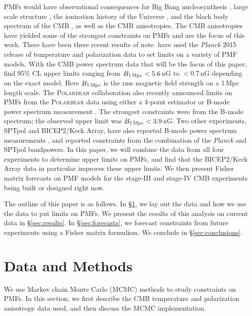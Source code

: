 \documentclass[apj]{emulateapj}
\newcommand{\bpmf}{\ensuremath{B_{\rm 1\,Mpc}}}
\newcommand{\planck}{{\sl Planck}}
\newcommand{\bicepkeck}{BICEP2/Keck Array}
\newcommand{\pb}{\textsc{Polarbear}}
\newcommand{\sptpol}{SPTpol}
\begin{document}
PMFs would have observational consequences for Big Bang nucleosynthesis \citep[e.g.,][]{kahniashvili10}, large scale structure \citep[e.g.,][]{battaner97}, the ionization history of the Universe \citep{kunze15}, and the black body spectrum of the CMB \citep[e.g.,][]{kunze14},  as well as the CMB anisotropies. 
The CMB anisotropies have yielded some of the strongest constraints on PMFs and are the focus of this work.
There have been three recent results of note. 
\citet{planck15-19} have used the \planck{} 2015 release of temperature and polarization data to set limits on a variety of PMF models. 
With the CMB power spectrum data that will be the focus of this paper, \citet{planck15-19} find 95\% CL upper limits ranging from $\bpmf < 5.6$\,nG to $<0.7$\,nG depending on the exact model. 
Here \bpmf{} is the rms magnetic field strength on a 1\,Mpc length scale. 
The \pb{} collaboration also recently announced limits on PMFs from the \pb{} data using either a 4-point estimator or B-mode power spectrum measurement \citep{polarbear15}. 
The strongest constraints were from the B-mode spectrum; the observed upper limit was $\bpmf < 3.9$\,nG. 
Two other experiments, \sptpol{} and \bicepkeck{}, have also reported B-mode power spectrum measurements \citep{keisler15,bicepkeck15}, 
and \citet{zucca16} reported constraints from the combination of the \planck{}  and \sptpol{} bandpowers. 
In this paper, we will combine the data from all four experiments to determine upper limits on PMFs, and find that the \bicepkeck{} data in particular improves these upper limits. 
We then present Fisher matrix forecasts on PMF models for the stage-III and stage-IV CMB experiments being built or designed right now. 



The outline of this paper is as follows. 
In \S\ref{sec:data}, we lay out the data and how we use the data to put limits on PMFs. 
We present the results of this analysis on current data in \S\ref{sec:results}. 
In \S\ref{sec:forecasts}, we forecast constraints from future experiments using a Fisher matrix formulism. 
We conclude in \S\ref{sec:conclusions}. 

\section{Data and Methods}
\label{sec:data}

We use  Markov chain Monte Carlo (MCMC) methods to study constraints on PMFs. 
In this section, we first describe the CMB temperature and polarization anisotropy data used, and then discuss the MCMC implementation. 
\end{document}
